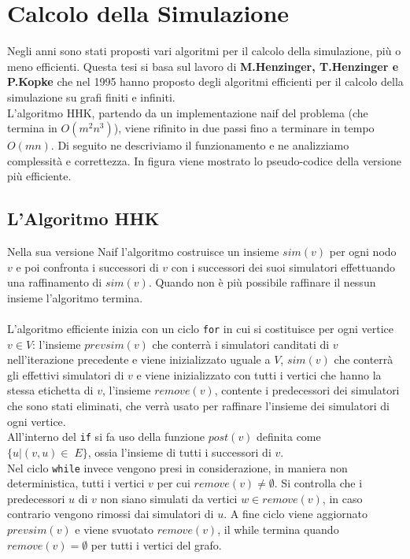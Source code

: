 \chapter{Calcolo della Simulazione}
Negli anni sono stati proposti vari algoritmi per il calcolo della simulazione, più o meno efficienti. Questa tesi si basa sul lavoro di \textbf{M.Henzinger, T.Henzinger e P.Kopke} che nel 1995 hanno proposto degli algoritmi efficienti per il calcolo della simulazione su grafi finiti e infiniti.\\
L'algoritmo HHK, partendo da un implementazione naif del problema (che termina in $O(m^2n^3)$), viene rifinito in due passi fino a terminare in tempo $O(mn)$. Di seguito ne descriviamo il funzionamento e ne analizziamo complessità e correttezza. In figura viene mostrato lo pseudo-codice della versione più efficiente.
\section{L'Algoritmo HHK}
Nella sua versione Naif l'algoritmo costruisce un insieme $sim(v)$ per ogni nodo $v$ e poi confronta i successori di $v$ con i successori dei suoi simulatori effettuando una raffinamento di $sim(v)$. Quando non è più possibile raffinare il nessun insieme l'algoritmo termina.
\\\\
L'algoritmo efficiente inizia con un ciclo \texttt{for} in cui si costituisce per ogni vertice $v \in V$: l'insieme $prevsim(v)$ che conterrà i simulatori canditati di $v$ nell'iterazione precedente e viene inizializzato uguale a $V$, $sim(v)$ che conterrà gli effettivi simulatori di $v$ e viene inizializzato con tutti i vertici che hanno la stessa etichetta di $v$, l'insieme $remove(v)$, contente i predecessori dei simulatori che sono stati eliminati, che verrà usato per raffinare l'insieme dei simulatori di ogni vertice.\\
All'interno del \texttt{if} si fa uso della funzione $post(v)$ definita come $\{u|(v,u)\in\;E\}$, ossia l'insieme di tutti i successori di $v$.\\
Nel ciclo \texttt{while} invece vengono presi in considerazione, in maniera non deterministica, tutti i vertici $v$ per cui $remove(v)\not=\emptyset$. Si controlla che i predecessori $u$ di $v$ non siano simulati da vertici $w \in remove(v)$, in caso contrario vengono rimossi dai simulatori di $u$. A fine ciclo viene aggiornato $prevsim(v)$ e viene svuotato $remove(v)$, il while termina quando $remove(v)=\emptyset$ per tutti i vertici del grafo.

